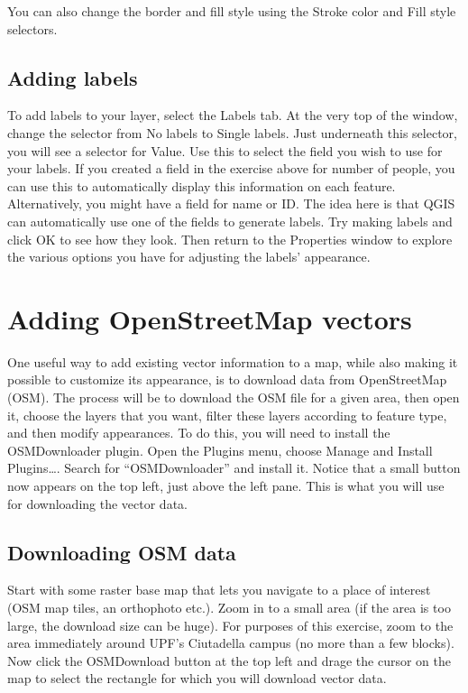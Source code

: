 \documentclass[]{book}
\begin{document}
You can also change the border and fill style using the Stroke color and Fill style selectors.

\hypertarget{adding-labels}{%
\section{Adding labels}\label{adding-labels}}

To add labels to your layer, select the Labels tab. At the very top of the window, change the selector from No labels to Single labels. Just underneath this selector, you will see a selector for Value. Use this to select the field you wish to use for your labels. If you created a field in the exercise above for number of people, you can use this to automatically display this information on each feature. Alternatively, you might have a field for name or ID. The idea here is that QGIS can automatically use one of the fields to generate labels. Try making labels and click OK to see how they look. Then return to the Properties window to explore the various options you have for adjusting the labels' appearance.

\hypertarget{osm-vectors}{%
\chapter{Adding OpenStreetMap vectors}\label{osm-vectors}}

One useful way to add existing vector information to a map, while also making it possible to customize its appearance, is to download data from OpenStreetMap (OSM). The process will be to download the OSM file for a given area, then open it, choose the layers that you want, filter these layers according to feature type, and then modify appearances. To do this, you will need to install the OSMDownloader plugin. Open the Plugins menu, choose Manage and Install Plugins\ldots{}. Search for ``OSMDownloader'' and install it. Notice that a small button now appears on the top left, just above the left pane. This is what you will use for downloading the vector data.

\hypertarget{downloading-osm-data}{%
\section{Downloading OSM data}\label{downloading-osm-data}}

Start with some raster base map that lets you navigate to a place of interest (OSM map tiles, an orthophoto etc.). Zoom in to a small area (if the area is too large, the download size can be huge). For purposes of this exercise, zoom to the area immediately around UPF's Ciutadella campus (no more than a few blocks). Now click the OSMDownload button at the top left and drage the cursor on the map to select the rectangle for which you will download vector data.
\end{document}
